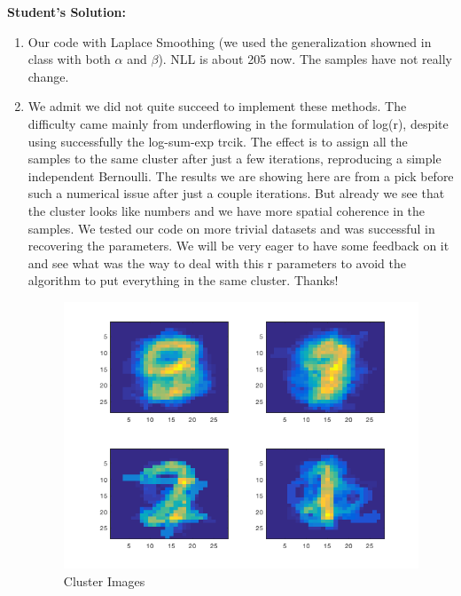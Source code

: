 \documentclass{article}
\begin{document}
\textbf{Student's Solution:}
\begin{enumerate}
  \item Our code with Laplace Smoothing (we used the generalization showned in class with both $\alpha$ and $\beta$). NLL is about 205 now. The samples have not really change.

  

  \item We admit we did not quite succeed to implement these methods. The difficulty came mainly from underflowing in the formulation of log(r), despite using successfully the log-sum-exp trcik. The effect is to assign all the samples to the same cluster after just a few iterations, reproducing a simple independent Bernoulli. The results we are showing here are from a pick before such a numerical issue after just a couple iterations. But already we see that the cluster looks like numbers and we have more spatial coherence in the samples. We tested our code on more trivial datasets and was successful in recovering the parameters. We will be very eager to have some feedback on it and see what was the way to deal with this r parameters to avoid the algorithm to put everything in the same cluster. Thanks!

    

\begin{figure}[!ht]
\centering
\includegraphics[scale=0.5]{./a3/cluster.png}
\caption{Cluster Images}
\label{cluster}
\end{figure}


\end{enumerate}
\end{document}
